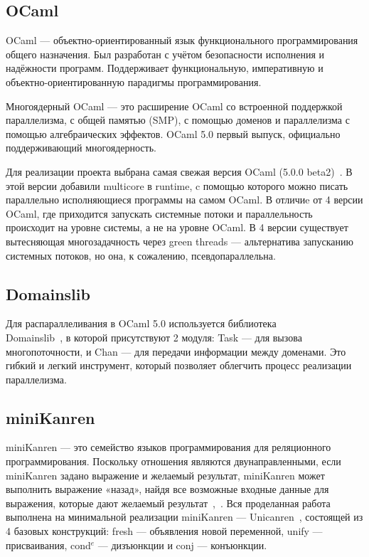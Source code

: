 \subsection{OCaml} OCaml --- объектно-ориентированный язык
функционального программирования общего назначения.
Был разработан с учётом безопасности исполнения и надёжности 
программ. Поддерживает функциональную, императивную
и объектно-ориентированную парадигмы программирования. 

Многоядерный OCaml --- это расширение OCaml со
встроенной поддержкой параллелизма, с
общей памятью (SMP), с помощью доменов и
параллелизма с помощью алгебраических эффектов. 
OCaml 5.0 первый 
выпуск, официально поддерживающий многоядерность.

Для реализации проекта выбрана самая свежая версия OCaml (5.0.0 beta2)~\cite{ocaml}.
В этой версии добавили multicore в runtime, c помощью которого можно
писать параллельно исполняющиеся программы на самом OCaml. В отличиe от 4 версии
OCaml, где приходится запускать системные потоки и параллельность происходит на уровне системы, 
а не на уровне OCaml. В 4 версии существует вытесняющая многозадачность 
через green threads --- альтернатива запусканию системных потоков, но она, к сожалению, псевдопараллельна.


\subsection{Domainslib} Для распараллеливания в OCaml 5.0 
используется библиотека \\Domainslib~\cite{domainslib}, 
в которой присутствуют 2 модуля: Task --- для вызова
многопоточности, и Chan --- для передачи информации между
доменами. Это гибкий и легкий инструмент, который позволяет 
облегчить процесс реализации параллелизма.

\subsection{miniKanren} miniKanren --- это семейство 
языков программирования для реляционного программирования. 
Поскольку отношения являются двунаправленными, если miniKanren 
задано выражение и желаемый результат, miniKanren может выполнить 
выражение «назад», найдя все возможные входные данные для 
выражения, которые дают желаемый результат~\cite{miniKanren},~\cite{berd}.
Вся проделанная работа выполнена на минимальной реализации
miniKanren --- Unicanren~\cite{unicanren}, состоящей из 4 базовых конструкций:
fresh --- объявления новой переменной, unify --- присваивания, cond$^e$ --- дизъюнкции и conj --- конъюнкции.
